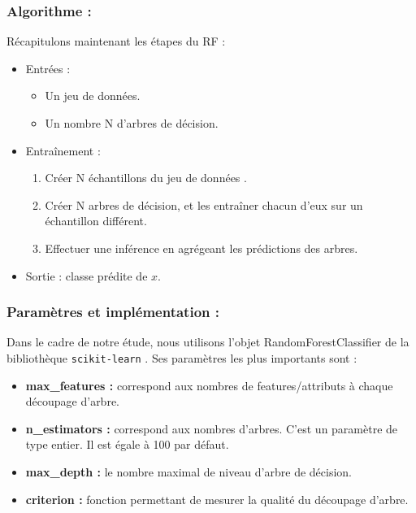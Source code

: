 \documentclass[11pt]{article}
\begin{document}
\subsubsection{Algorithme :}

Récapitulons maintenant les étapes du RF :

    \begin{itemize}
        \item Entrées :
            \begin{itemize}
                \item Un jeu de données.
                \item Un nombre  N d’arbres de décision.
            \end{itemize}

        \item Entraînement :
            \begin{enumerate}
                \item Créer N échantillons du jeu de données .
                \item Créer N arbres de décision, et les entraîner chacun d'eux sur un échantillon différent.
                \item Effectuer une inférence en agrégeant les prédictions des arbres.
            \end{enumerate}

        \item Sortie : classe prédite de $x$.
    \end{itemize}

\subsubsection{Paramètres et implémentation :}

Dans le cadre de notre étude, nous utilisons l'objet RandomForestClassifier de la bibliothèque \texttt{scikit-learn} \citep{scikit_learn}. Ses paramètres les plus importants sont :
\begin{itemize}
    \item \textbf{max\_features :} correspond aux nombres de features/attributs à chaque découpage d'arbre. 
    \item \textbf{n\_estimators :} correspond aux nombres d'arbres. C'est un paramètre de type entier. Il est égale à 100 par défaut.
    \item \textbf{max\_depth :} le nombre maximal de niveau d'arbre de décision.
    \item \textbf{criterion :} fonction permettant de mesurer la qualité du découpage d'arbre.
\end{itemize}
\end{document}
